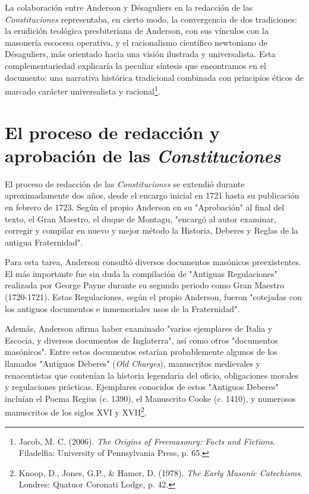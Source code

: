 \documentclass[a4paper,12pt,twoside]{book}
\begin{document}
La colaboración entre Anderson y Désaguliers en la redacción de las \textit{Constituciones} representaba, en cierto modo, la convergencia de dos tradiciones: la erudición teológica presbiteriana de Anderson, con sus vínculos con la masonería escocesa operativa, y el racionalismo científico newtoniano de Désaguliers, más orientado hacia una visión ilustrada y universalista. Esta complementariedad explicaría la peculiar síntesis que encontramos en el documento: una narrativa histórica tradicional combinada con principios éticos de marcado carácter universalista y racional\footnote{Jacob, M. C. (2006). \textit{The Origins of Freemasonry: Facts and Fictions}. Filadelfia: University of Pennsylvania Press, p. 65.}.

\section{El proceso de redacción y aprobación de las \textit{Constituciones}}

El proceso de redacción de las \textit{Constituciones} se extendió durante aproximadamente dos años, desde el encargo inicial en 1721 hasta su publicación en febrero de 1723. Según el propio Anderson en su "Aprobación" al final del texto, el Gran Maestro, el duque de Montagu, "encargó al autor examinar, corregir y compilar en nuevo y mejor método la Historia, Deberes y Reglas de la antigua Fraternidad".

Para esta tarea, Anderson consultó diversos documentos masónicos preexistentes. El más importante fue sin duda la compilación de "Antiguas Regulaciones" realizada por George Payne durante su segundo periodo como Gran Maestro (1720-1721). Estas Regulaciones, según el propio Anderson, fueron "cotejadas con los antiguos documentos e inmemoriales usos de la Fraternidad".

Además, Anderson afirma haber examinado "varios ejemplares de Italia y Escocia, y diversos documentos de Inglaterra", así como otros "documentos masónicos". Entre estos documentos estarían probablemente algunos de los llamados "Antiguos Deberes" (\textit{Old Charges}), manuscritos medievales y renacentistas que contenían la historia legendaria del oficio, obligaciones morales y regulaciones prácticas. Ejemplares conocidos de estos "Antiguos Deberes" incluían el Poema Regius (c. 1390), el Manuscrito Cooke (c. 1410), y numerosos manuscritos de los siglos XVI y XVII\footnote{Knoop, D., Jones, G.P., \& Hamer, D. (1978). \textit{The Early Masonic Catechisms}. Londres: Quatuor Coronati Lodge, p. 42.}.
\end{document}
